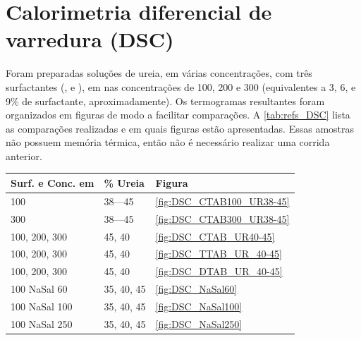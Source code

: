 \section{Calorimetria diferencial de varredura (DSC)}
	    
	Foram preparadas soluções de ureia, em várias concentrações, com três surfactantes (\CTAB, \TTAB{} e \DTAB), em nas concentrações de 100, 200 e 300 \mM{} (equivalentes a 3, 6, e 9\% de surfactante, aproximadamente). Os termogramas resultantes foram organizados em figuras de modo a facilitar comparações. A \autoref{tab:refs_DSC} lista as comparações realizadas e em quais figuras estão apresentadas. Essas amostras não possuem memória térmica, então não é necessário realizar uma corrida anterior.
    
    \begin{table}[h]
            {%
            \begin{tabular}{l p{1.5cm} p{1.5cm}}
                \toprule
				Surf. e Conc. em \mM             & \% Ureia		 & Figura 			\\
    			\midrule
				\CTAB{} 100	                     & 38---45		 & \ref{fig:DSC_CTAB100_UR38-45}\\
				\CTAB{} 300	                     & 38---45		 & \ref{fig:DSC_CTAB300_UR38-45}\\
				\CTAB{} 100, 200, 300	             & 45, 40	     & \ref{fig:DSC_CTAB_UR40-45}	\\
				\TTAB{} 100, 200, 300	             & 45, 40	     & \ref{fig:DSC_TTAB_UR_40-45}	\\
				\DTAB{} 100, 200, 300	             & 45, 40	     & \ref{fig:DSC_DTAB_UR_40-45}	\\
    			\midrule
				\CTAB{} 100 NaSal 60	             & 35, 40, 45	 & \ref{fig:DSC_NaSal60}		\\
				\CTAB{} 100 NaSal 100	             & 35, 40, 45	 & \ref{fig:DSC_NaSal100}	\\
				\CTAB{} 100 NaSal 250	             & 35, 40, 45	 & \ref{fig:DSC_NaSal250}	\\
    			\bottomrule
            \end{tabular}%
            }{}
    \end{table}
	

